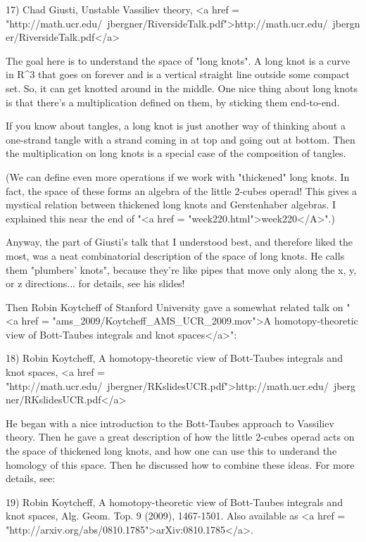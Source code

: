 17) Chad Giusti, Unstable Vassiliev theory,
<a href = "http://math.ucr.edu/~jbergner/RiversideTalk.pdf">http://math.ucr.edu/~jbergner/RiversideTalk.pdf</a>

The goal here is to understand the space of "long knots".  A
long knot is a curve in R^{3} that goes on forever and is a
vertical straight line outside some compact set.  So, it can get
knotted around in the middle.  One nice thing about long knots is that
there's a multiplication defined on them, by sticking them end-to-end.

If you know about tangles, a long knot is just another way of thinking
about a one-strand tangle with a strand coming in at top and going
out at bottom.  Then the multiplication on long knots is a special 
case of the composition of tangles.

(We can define even more operations if we work with
"thickened" long knots.  In fact, the space of these forms
an algebra of the little 2-cubes operad!  This gives a mystical
relation between thickened long knots and Gerstenhaber algebras.  I
explained this near the end of "<a href =
"week220.html">week220</A>".)

Anyway, the part of Giusti's talk that I understood best, and
therefore liked the most, was a neat combinatorial description
of the space of long knots. He calls them "plumbers' knots",
because they're like pipes that move only along the x, y, or z
directions... for details, see his slides!

Then Robin Koytcheff of Stanford University gave a somewhat related
talk on "<a href = "ams_2009/Koytcheff_AMS_UCR_2009.mov">A homotopy-theoretic view of Bott-Taubes integrals and knot
spaces</a>":

18) Robin Koytcheff, A homotopy-theoretic view of Bott-Taubes integrals
and knot spaces, <a href = "http://math.ucr.edu/~jbergner/RKslidesUCR.pdf">http://math.ucr.edu/~jbergner/RKslidesUCR.pdf</a>

He began with a nice introduction to the Bott-Taubes approach to
Vassiliev theory.  Then he gave a great description of how the
little 2-cubes operad acts on the space of thickened long knots, 
and how one can use this to underand the homology of this space.
Then he discussed how to combine these ideas.  For more details, see:

19) Robin Koytcheff, A homotopy-theoretic view of Bott-Taubes integrals
and knot spaces, Alg. Geom. Top. 9 (2009), 1467-1501.  Also available as
<a href = "http://arxiv.org/abs/0810.1785">arXiv:0810.1785</a>.

